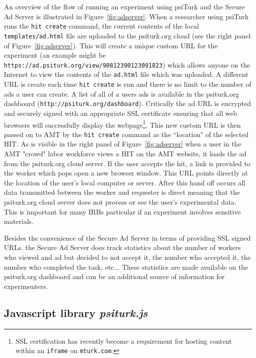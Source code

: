 \documentclass[twocolumn]{svjour3}          %
\begin{document}
An overview of the flow of running an experiment using
\textsf{psiTurk} and the Secure Ad Server is illustrated in
Figure~\ref{fig:adserver}.  When a researcher using \textsf{psiTurk}
runs the \texttt{hit create} command, the current contents of the local
\texttt{templates/ad.html} file are uploaded to the psiturk.org cloud (see
the right panel of Figure~\ref{fig:adserver}).
This will create a unique custom URL for the experiment (an example might be
\texttt{https://ad.psiturk.org/view/90812390123091823}) which
allows anyone on the Internet to view the contents of the \texttt{ad.html}
file which was uploaded.  A different URL is create each time \texttt{hit create}
is run and there is no limit to the number of ads a user can create.  A list
of all of a users ads is available in the psiturk.org dashboard (\texttt{http://psiturk.org/dashboard}).
Critically the ad URL is encrypted and
securely signed with an appropriate SSL certificate ensuring that all
web browsers will successfully display the webpage\footnote{SSL certification has recently become a requirement for hosting content within an \texttt{iframe} on \texttt{mturk.com}.}.  This new custom URL is then passed
on to AMT by the \texttt{hit create} command as the ``location" of
the selected HIT.  As is visible in the right panel of Figure~\ref{fig:adserver}
when a user in the AMT "crowd" labor workforce views a HIT on the AMT
website, it loads the ad from the psiturk.org cloud server.  If the user accepts
the hit, a link is provided to the worker which pops open a new browser
window.  This URL points directly at the location of the user's local computer
or server.  After this hand off occurs all data transmitted between the worker
and requester is direct meaning that the psiturk.org cloud server does not
process or see the user's experimental data.  This is important for many IRBs
particular if an experiment involves sensitive materials.

Besides the convenience of the Secure Ad Server in terms of providing
SSL signed URLs, the Secure Ad Server does track statistics about the
number of workers who viewed and ad but decided to not accept it, the
number who accepted it, the number who completed the task, etc...
These statistics are made available on the psiturk.org dashboard
and can be an additional source of information for experimenters.


\subsection{Javascript library \emph{psiturk.js}}
\end{document}
